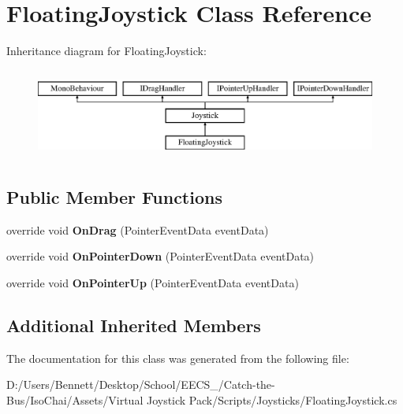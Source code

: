 \hypertarget{class_floating_joystick}{}\section{Floating\+Joystick Class Reference}
\label{class_floating_joystick}
Inheritance diagram for Floating\+Joystick\+:\begin{figure}[H]
\begin{center}
\leavevmode
\includegraphics[height=3.000000cm]{class_floating_joystick}
\end{center}
\end{figure}
\subsection*{Public Member Functions}
\begin{DoxyCompactItemize}
\item 
\mbox{\label{class_floating_joystick_a522d320721f122a99ba50701447eaf1f}} 
override void {\bfseries On\+Drag} (Pointer\+Event\+Data event\+Data)
\item 
\mbox{\label{class_floating_joystick_ae6793e17984d80f589de93afbd697bb9}} 
override void {\bfseries On\+Pointer\+Down} (Pointer\+Event\+Data event\+Data)
\item 
\mbox{\label{class_floating_joystick_af651ab0edbcbd7f644b81035c3e66d12}} 
override void {\bfseries On\+Pointer\+Up} (Pointer\+Event\+Data event\+Data)
\end{DoxyCompactItemize}
\subsection*{Additional Inherited Members}


The documentation for this class was generated from the following file\+:\begin{DoxyCompactItemize}
\item 
D\+:/\+Users/\+Bennett/\+Desktop/\+School/\+E\+E\+C\+S\+\_/\+Catch-\/the-\/\+Bus/\+Iso\+Chai/\+Assets/\+Virtual Joystick Pack/\+Scripts/\+Joysticks/Floating\+Joystick.\+cs\end{DoxyCompactItemize}
